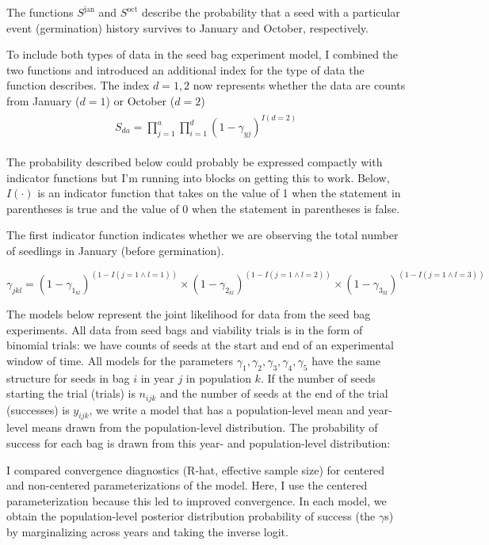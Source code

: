 \documentclass[12pt, oneside, titlepage]{article}   	%
\begin{document}
The functions $S^\mathrm{jan}$ and $S^\mathrm{oct}$ describe the probability that a seed with a particular event (germination) history survives to January and October, respectively. 

To include both types of data in the seed bag experiment model, I combined the two functions and introduced an additional index for the type of data the function describes. The index $d=1,2$ now represents whether the data are counts from January ($d=1$) or October ($d=2$)
%
\begin{align}
  \begin{split}
S_{da} =  \prod_{j=1}^{a} \prod_{i=1}^{d}  (1- \gamma_{yj} )^{I(d=2)}
  \end{split}
\end{align}
%

%


The probability described below could probably be expressed compactly with indicator functions but I'm running into blocks on getting this to work. Below, $I(\cdot)$ is an indicator function that takes on the value of 1 when the statement in parentheses is true and the value of 0 when the statement in parentheses is false.

The first indicator function indicates whether we are observing the total number of seedlings in January (before germination).


\clearpage
$ \gamma_{jkl} = (1-\gamma_{1_{kl}})^{(1-I(j=1 \land l=1))} \times (1-\gamma_{2_{kl}})^{(1-I(j=1 \land l=2))} \times (1-\gamma_{3_{kl}})^{(1-I(j=1 \land l=3))}$


\clearpage

The models below represent the joint likelihood for data from the seed bag experiments. All data from seed bags and viability trials is in the form of binomial trials: we have counts of seeds at the start and end of an experimental window of time. All models for the parameters $\gamma_1, \gamma_2, \gamma_3, \gamma_4, \gamma_5$ have the same structure for seeds in bag $i$ in year $j$ in population $k$. If the number of seeds starting the trial (trials) is $n_{ijk}$ and the number of seeds at the end of the trial (successes) is $y_{ijk}$, we write a model that has a population-level mean and year-level means drawn from the population-level distribution. The probability of success for each bag is drawn from this year- and population-level distribution:

I compared convergence diagnostics (R-hat, effective sample size) for centered and non-centered parameterizations of the model. Here, I use the centered parameterization because this led to improved convergence. In each model, we obtain the population-level posterior distribution probability of success (the $\gamma$s) by marginalizing across years and taking the inverse logit.
\end{document}
